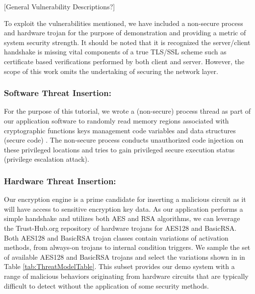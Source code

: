 \documentclass[sigconf]{acmart}
\theoremstyle{plain}
\theoremstyle{remark}
\begin{document}
[General Vulnerability Descriptions?]


To exploit the vulnerabilities mentioned, we have included a non-secure process and hardware trojan for the purpose of demonstration and providing a metric of system security strength. It should be noted that it is recognized the server/client handshake is missing vital components of a true TLS/SSL scheme such as certificate based verifications performed by both client and server. However, the scope of this work omits the undertaking of securing the network layer.

\subsubsection{Software Threat Insertion:}
For the purpose of this tutorial, we wrote a (non-secure) process thread as part of our application software to randomly read memory regions associated with cryptographic functions keys management code variables and data structures (secure code) . The non-secure process conducts unauthorized code injection on these privileged locations and tries to gain privileged secure execution status (privilege escalation attack).


\subsubsection{Hardware Threat Insertion:}

Our encryption engine is a prime candidate for inserting a malicious circuit as it will have access to sensitive encryption key data. As our application performs a simple handshake and utilizes both AES and RSA algorithms, we can leverage the Trust-Hub.org repository of hardware trojans for AES128 and BasicRSA. Both AES128 and BasicRSA trojan classes contain variations of activation methods, from always-on trojans to internal condition triggers. We sample the set of available AES128 and BasicRSA trojans and select the variations shown in in Table \ref{tab:ThreatModelTable}. This subset provides our demo system with a range of malicious behaviors originating from hardware circuits that are typically difficult to detect without the application of some security methods.
\end{document}
